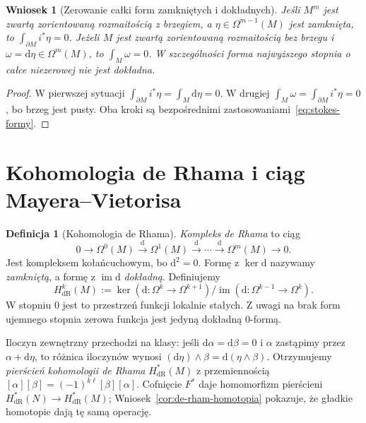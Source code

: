 \documentclass[11pt,a4paper,oneside]{report}
\newcommand{\dd}{\mathrm d}
\theoremstyle{plain}
\newtheorem{wniosek}[twierdzenie]{Wniosek}
\theoremstyle{definition}
\newtheorem{definicja}[twierdzenie]{Definicja}
\theoremstyle{remark}
\begin{document}
\begin{wniosek}[Zerowanie całki form zamkniętych i dokładnych]
\label{cor:stokes-top-form}
Jeśli $M^m$ jest zwartą zorientowaną rozmaitością
z brzegiem, a $\eta\in\Omega^{m-1}(M)$ jest
zamknięta, to $\int_{\partial M}i^*\eta=0$.
Jeżeli $M$ jest zwartą zorientowaną rozmaitością
bez brzegu i $\omega=\dd\eta\in\Omega^m(M)$,
to $\int_M\omega=0$. W szczególności forma
najwyższego stopnia o całce niezerowej nie jest
dokładna.
\end{wniosek}
\begin{proof}
W pierwszej sytuacji
$\int_{\partial M}i^*\eta=\int_M\dd\eta=0$.
W drugiej
$\int_M\omega=\int_{\partial M}i^*\eta=0$,
bo brzeg jest pusty. Oba kroki są
bezpośrednimi zastosowaniami~\eqref{eq:stokes-formy}.
\end{proof}
\section{Kohomologia de Rhama i ciąg Mayera--Vietorisa}
\label{sec:de-rham-mv}

\begin{definicja}[Kohomologia de Rhama]
\label{def:de-rham-cohomology}
\emph{Kompleks de Rhama} to ciąg
\[
 0\longrightarrow\Omega^0(M)\xrightarrow{\dd}
 \Omega^1(M)\xrightarrow{\dd}\cdots
 \xrightarrow{\dd}\Omega^m(M)\longrightarrow0.
\]
Jest kompleksem kołańcuchowym, bo $\dd^2=0$.
Formę z $\ker\dd$ nazywamy \emph{zamkniętą},
a formę z $\operatorname{im}\dd$ \emph{dokładną}. Definiujemy
\[
 H^k_{\mathrm{dR}}(M)
 :=\ker(\dd:\Omega^k\to\Omega^{k+1})/
   \operatorname{im}(\dd:\Omega^{k-1}\to\Omega^k).
\]
W stopniu $0$ jest to przestrzeń funkcji lokalnie stałych.
Z uwagi na brak form ujemnego stopnia zerowa funkcja
jest jedyną dokładną $0$-formą.
\end{definicja}

Iloczyn zewnętrzny przechodzi na klasy: jeśli
$\dd\alpha=\dd\beta=0$ i $\alpha$ zastąpimy przez
$\alpha+\dd\eta$, to różnica iloczynów wynosi
$(\dd\eta)\wedge\beta=\dd(\eta\wedge\beta)$.
Otrzymujemy \emph{pierścień kohomologii de Rhama}
$H^*_{\mathrm{dR}}(M)$ z przemiennością
$[\alpha][\beta]=(-1)^{k\ell}[\beta][\alpha]$.
Cofnięcie $F^*$ daje homomorfizm pierścieni
$H^*_{\mathrm{dR}}(N)\to H^*_{\mathrm{dR}}(M)$;
Wniosek~\ref{cor:de-rham-homotopia} pokazuje, że
gładkie homotopie dają tę samą operację.
\end{document}
